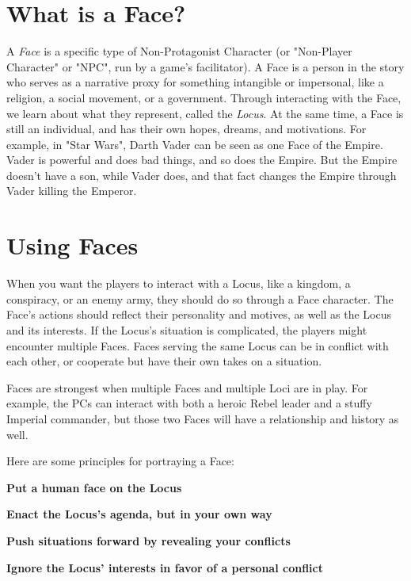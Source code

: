 \documentclass[10pt,oneside,letterpaper,landscape]{memoir}
\begin{document}
\begin{multicols}{3}
\vspace{2mm}

\section{What is a Face?}

A \textit{Face} is a specific type of Non-Protagonist Character (or "Non-Player Character" or "NPC", run by a game's facilitator). A Face is a person in the story who serves as a narrative proxy for something intangible or impersonal, like a religion, a social movement, or a government. Through interacting with the Face, we learn about what they represent, called the \textit{Locus}. At the same time, a Face is still an individual, and has their own hopes, dreams, and motivations. For example, in "Star Wars", Darth Vader can be seen as one Face of the Empire. Vader is powerful and does bad things, and so does the Empire. But the Empire doesn't have a son, while Vader does, and that fact changes the Empire through Vader killing the Emperor.

\section{Using Faces}

When you want the players to interact with a Locus, like a kingdom, a conspiracy, or an enemy army, they should do so through a Face character. The Face's actions should reflect their personality and motives, as well as the Locus and its interests. If the Locus's situation is complicated, the players might encounter multiple Faces. Faces serving the same Locus can be in conflict with each other, or cooperate but have their own takes on a situation.

Faces are strongest when multiple Faces and multiple Loci are in play. For example, the PCs can interact with both a heroic Rebel leader and a stuffy Imperial commander, but those two Faces will have a relationship and history as well.

Here are some principles for portraying a Face:

\textbf{Put a human face on the Locus}

\textbf{Enact the Locus's agenda, but in your own way}

\textbf{Push situations forward by revealing your conflicts}

\textbf{Ignore the Locus' interests in favor of a personal conflict}


\end{multicols}
\end{document}
